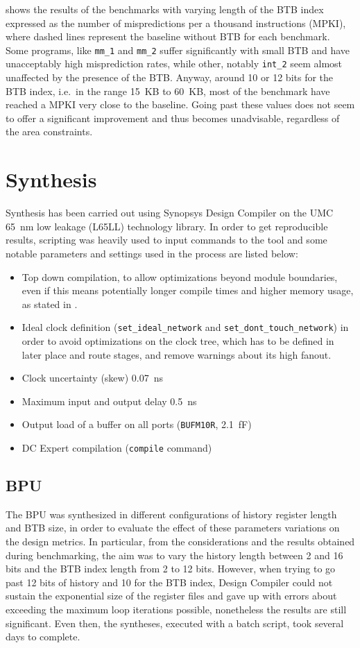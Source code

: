  shows the results of the benchmarks with varying length of the \ac{BTB} index expressed as the number of mispredictions per a thousand instructions (MPKI), where dashed lines represent the baseline without \ac{BTB} for each benchmark. Some programs, like \texttt{mm\_1} and \texttt{mm\_2} suffer significantly with small \acs{BTB} and have unacceptably high misprediction rates, while other, notably \texttt{int\_2} seem almost unaffected by the presence of the \ac{BTB}. Anyway, around 10 or 12 bits for the \ac{BTB} index, i.e.\ in the range \SI{15}{KB} to \SI{60}{KB}, most of the benchmark have reached a MPKI very close to the baseline. Going past these values does not seem to offer a significant improvement and thus becomes unadvisable, regardless of the area constraints.

\pagebreak
\section{Synthesis}
Synthesis has been carried out using Synopsys Design Compiler on the UMC \SI{65}{nm} low leakage (L65LL) technology library. In order to get reproducible results, scripting was heavily used to input commands to the tool and some notable parameters and settings used in the process are listed below:
\begin{itemize}
  \item Top down compilation, to allow optimizations beyond module boundaries, even if this means potentially longer compile times and higher memory usage, as stated in \cite[p.8-6]{dc}.
  \item Ideal clock definition (\texttt{set\_ideal\_network} and \texttt{set\_dont\_touch\_network}) in order to avoid optimizations on the clock tree, which has to be defined in later place and route stages, and remove warnings about its high fanout.
  \item Clock uncertainty (skew) \SI{0.07}{ns}
  \item Maximum input and output delay \SI{0.5}{ns}
  \item Output load of a buffer on all ports (\texttt{BUFM10R}, \SI{2.1}{\femto\farad})
  \item DC Expert compilation (\texttt{compile} command)
\end{itemize}

\subsection{\acs{BPU}}
The \ac{BPU} was synthesized in different configurations of history register length and \ac{BTB} size, in order to evaluate the effect of these parameters variations on the design metrics. In particular, from the considerations and the results obtained during benchmarking, the aim was to vary the history length between 2 and 16 bits and the \ac{BTB} index length from 2 to 12 bits. However, when trying to go past 12 bits of history and 10 for the \ac{BTB} index, Design Compiler could not sustain the exponential size of the register files and gave up with errors about exceeding the maximum loop iterations possible, nonetheless the results are still significant. Even then, the syntheses, executed with a batch script, took several days to complete.

